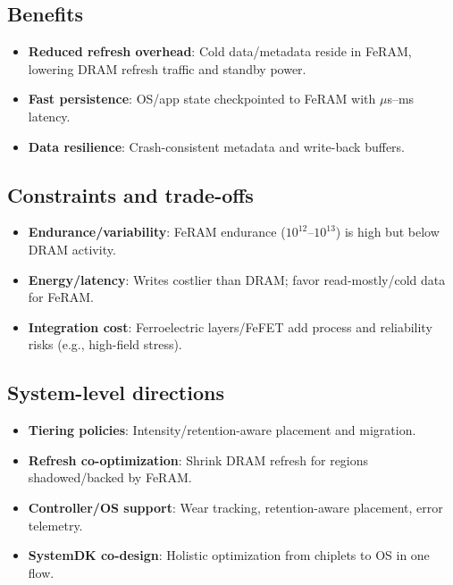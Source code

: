 \subsection*{Benefits}
\begin{itemize}
  \item \textbf{Reduced refresh overhead}: Cold data/metadata reside in FeRAM, lowering DRAM refresh traffic and standby power.
  \item \textbf{Fast persistence}: OS/app state checkpointed to FeRAM with $\mu$s--ms latency.
  \item \textbf{Data resilience}: Crash-consistent metadata and write-back buffers.
\end{itemize}

\subsection*{Constraints and trade-offs}
\begin{itemize}
  \item \textbf{Endurance/variability}: FeRAM endurance ($10^{12}$--$10^{13}$) is high but below DRAM activity.
  \item \textbf{Energy/latency}: Writes costlier than DRAM; favor read-mostly/cold data for FeRAM.
  \item \textbf{Integration cost}: Ferroelectric layers/FeFET add process and reliability risks (e.g., high-field stress).
\end{itemize}

\subsection*{System-level directions}
\begin{itemize}
  \item \textbf{Tiering policies}: Intensity/retention-aware placement and migration.
  \item \textbf{Refresh co-optimization}: Shrink DRAM refresh for regions shadowed/backed by FeRAM.
  \item \textbf{Controller/OS support}: Wear tracking, retention-aware placement, error telemetry.
  \item \textbf{SystemDK co-design}: Holistic optimization from chiplets to OS in one flow.
\end{itemize}
